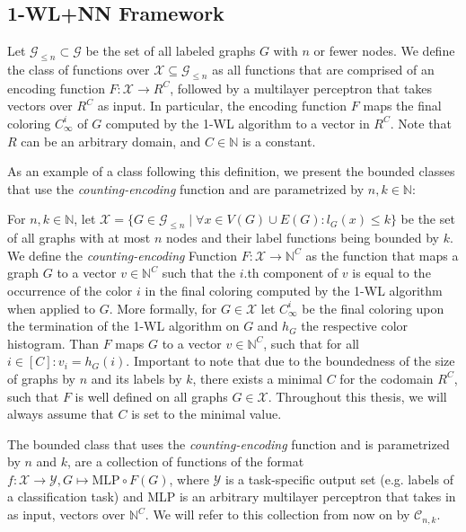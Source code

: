 \documentclass[11pt, dvipsnames, DIV=12]{scrreprt}
\theoremstyle{definition}
\newcommand{\Nb}{\mathbb{N}}
\newcommand{\wlnn}{\text{1-WL+NN }}
\begin{document}
\subsection{1-WL+NN Framework}\label{sec:1-WL+NN Definition}
Let $\mathcal{G}_{\leq n} \subset \mathcal{G}$ be the set of all labeled graphs $G$ with $n$ or fewer nodes. We define the class \wlnn of functions over $\mathcal{X} \subseteq \mathcal{G}_{\leq n}$ as all functions that are comprised of an encoding function $F: \mathcal{X} \rightarrow R^C$, followed by a multilayer perceptron that takes vectors over $R^C$ as input. In particular, the encoding function $F$ maps the final coloring $C^i_\infty$ of $G$ computed by the 1-WL algorithm to a vector in $R^C$. Note that $R$ can be an arbitrary domain, and $C \in \Nb$ is a constant.

As an example of a class following this definition, we present the bounded \wlnn classes that use the \emph{counting-encoding} function and are parametrized by $n, k \in \Nb$:

For $n, k \in \mathbb{N}$, let $\mathcal{X} = \{ G \in \mathcal{G}_{\leq n} \mid \forall x \in V(G) \cup E(G): l_G(x) \leq k \}$ be the set of all graphs with at most $n$ nodes and their label functions being bounded by $k$. We define the \emph{counting-encoding} Function $F: \mathcal{X} \rightarrow \mathbb{N}^C$ as the function that maps a graph $G$ to a vector $v \in \mathbb{N}^C$ such that the $i$.th component of $v$ is equal to the occurrence of the color $i$ in the final coloring computed by the 1-WL algorithm when applied to $G$. More formally, for $G \in \mathcal{X}$ let $C^i_\infty$ be the final coloring upon the termination of the 1-WL algorithm on $G$ and $h_{G}$ the respective color histogram. Than $F$ maps $G$ to a vector $v \in \mathbb{N}^C$, such that for all $i \in [C]: v_i = h_{G}(i)$. Important to note that due to the boundedness of the size of graphs by $n$ and its labels by $k$, there exists a minimal $C$ for the codomain $R^C$, such that $F$ is well defined on all graphs $G \in \mathcal{X}$. Throughout this thesis, we will always assume that $C$ is set to the minimal value.

The bounded \wlnn class that uses the \emph{counting-encoding} function and is parametrized by $n$ and $k$, are a collection of functions of the format $f:\mathcal{X} \rightarrow \mathcal{Y}, G \mapsto \text{MLP} \circ F(G)$, where $\mathcal{Y}$ is a task-specific output set (e.g. labels of a classification task) and MLP is an arbitrary multilayer perceptron that takes in as input, vectors over $\Nb^C$. We will refer to this collection from now on by $\mathcal{C}_{n,k}$.
\end{document}
